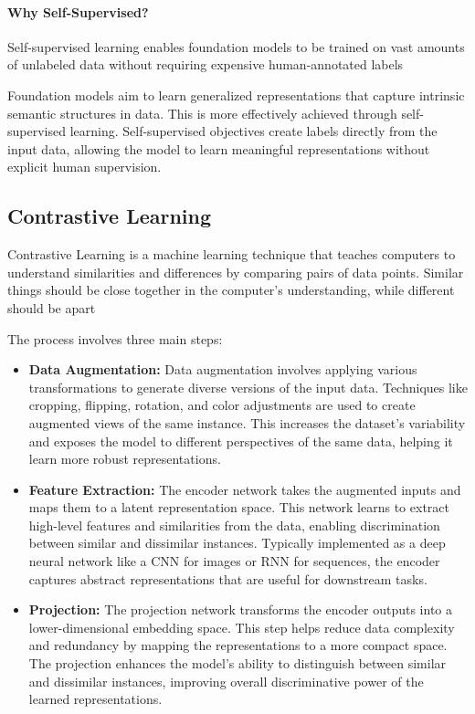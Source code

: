 \documentclass[letterpaper,12pt]{article}
\begin{document}
\begin{spacing}{1.125}
\paragraph{Why Self-Supervised?}

Self-supervised learning enables foundation models to be trained on vast amounts of unlabeled data without requiring expensive human-annotated labels

Foundation models aim to learn generalized representations that capture
intrinsic semantic structures in data. This is more effectively achieved through
self-supervised learning. Self-supervised objectives create labels directly from the input data, allowing the model to learn meaningful representations without explicit human supervision.


\subsection{Contrastive Learning}


Contrastive Learning is a machine learning technique that teaches computers to understand similarities and
differences by comparing pairs of data points. Similar things should be close together in the computer’s
understanding, while different should be apart

The process involves three main steps:

\begin{itemize}
  \item \textbf{Data Augmentation:} Data augmentation involves applying various transformations to generate diverse versions of the input data. Techniques like cropping, flipping, rotation, and color adjustments are used to create augmented views of the same instance. This increases the dataset's variability and exposes the model to different perspectives of the same data, helping it learn more robust representations.

  \item \textbf{Feature Extraction:}
The encoder network takes the augmented inputs and maps them to a latent representation space. This network learns to extract high-level features and similarities from the data, enabling discrimination between similar and dissimilar instances. Typically implemented as a deep neural network like a CNN for images or RNN for sequences, the encoder captures abstract representations that are useful for downstream tasks.

\item \textbf{Projection:} The projection network transforms the encoder outputs into a lower-dimensional embedding space. This step helps reduce data complexity and redundancy by mapping the representations to a more compact space. The projection enhances the model's ability to distinguish between similar and dissimilar instances, improving overall discriminative power of the learned representations.


\end{itemize}
\end{spacing}
\end{document}
